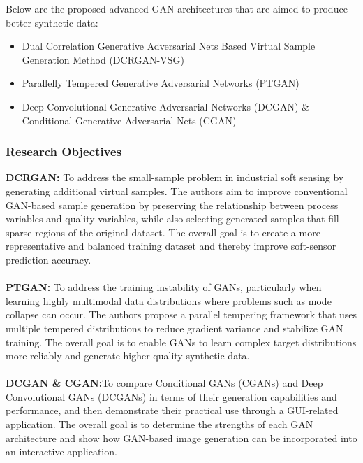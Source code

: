 \documentclass[12pt,a4paper]{article}
\begin{document}

Below are the proposed advanced GAN architectures that are aimed to produce better synthetic data:
\begin{itemize}
    \item Dual Correlation Generative Adversarial Nets Based Virtual Sample Generation Method (DCRGAN-VSG)
    \item Parallelly Tempered Generative Adversarial Networks (PTGAN)
    \item Deep Convolutional Generative Adversarial Networks (DCGAN) \& Conditional Generative Adversarial Nets (CGAN)
\end{itemize}

\subsubsection{Research Objectives}
\textbf{DCRGAN:} To address the small-sample problem in industrial soft sensing by generating additional virtual samples. The authors aim to improve conventional GAN-based sample generation by preserving the relationship between process variables and quality variables, while also selecting generated samples that fill sparse regions of the original dataset. The overall goal is to create a more representative and balanced training dataset and thereby improve soft-sensor prediction accuracy. \\
\\ \textbf{PTGAN:} To address the training instability of GANs, particularly when learning highly multimodal data distributions where problems such as mode collapse can occur. The authors propose a parallel tempering framework that uses multiple tempered distributions to reduce gradient variance and stabilize GAN training. The overall goal is to enable GANs to learn complex target distributions more reliably and generate higher-quality synthetic data. \\
\\ \textbf{DCGAN \& CGAN:}To compare Conditional GANs (CGANs) and Deep Convolutional GANs (DCGANs) in terms of their generation capabilities and performance, and then demonstrate their practical use through a GUI-related application. The overall goal is to determine the strengths of each GAN architecture and show how GAN-based image generation can be incorporated into an interactive application.
\end{document}
